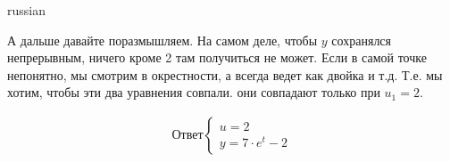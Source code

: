 \documentclass{article}
\begin{document}
\begin{otherlanguage*}{russian}
\begin{enumerate}
А дальше давайте поразмышляем. На самом деле, чтобы $ y $ сохранялся непрерывным, ничего кроме 2 там получиться не может. Если в самой точке непонятно, мы смотрим в окрестности, а всегда ведет как двойка и т.д. Т.е. мы хотим, чтобы эти два уравнения совпали. они совпадают только при $ u_1 = 2 $. 

\begin{align*}
\text{Ответ} 
\begin{cases} 
u = 2 \\
y = 7 \cdot e^t - 2
\end{cases}
\end{align*}
\end{enumerate}
\end{otherlanguage*}
\end{document}
